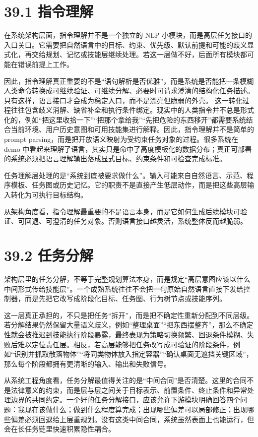 \section*{39.1 指令理解}


在系统架构层面，指令理解并不是一个独立的 NLP 小模块，而是高层任务接口的入口关口。它需要把自然语言中的目标、约束、优先级、默认前提和可能的歧义显式化，再交给规划、记忆或技能层继续处理。若这一层做不好，后面所有模块都可能在错误前提上工作。

因此，指令理解真正重要的不是“语句解析是否优雅”，而是系统是否能把一条模糊人类命令转换成可继续验证、可继续分解、必要时可请求澄清的结构化任务描述。只有这样，语言接口才会成为稳定入口，而不是漂亮但脆弱的外壳。 这一转化过程往往包含歧义消解、缺省补全和执行条件绑定。现实中的人类指令并不总是形式化的，例如“把这里收拾一下”“把那个拿给我”“先把危险的东西移开”都需要系统结合当前环境、用户历史意图和可用技能集进行解释。因此，指令理解并不是简单的 prompt parsing，而是把开放语义映射为受约束任务对象的过程。很多系统在 demo 中看起来理解了语言，其实只是命中了高度模板化的数据分布；真正可部署的系统必须把语言理解输出落成显式目标、约束条件和可检查完成标准。

任务理解层处理的是“系统到底被要求做什么”。输入可能来自自然语言、示范、程序模板、任务图或历史记忆。它的职责不是直接产生低层动作，而是把这些高层输入转化为可执行目标结构。

从架构角度看，指令理解最重要的不是语言本身，而是它如何生成后续模块可验证、可回退、可澄清的任务对象。否则语言接口越灵活，系统整体反而越脆弱。

\section*{39.2 任务分解}


架构层里的任务分解，不等于完整规划算法本身，而是规定“高层意图应该以什么中间形式传给技能层”。一个成熟系统往往不会把一句原始自然语言直接下发给控制器，而是先把它改写成阶段化目标、任务图、行为树节点或技能序列。

这一层真正承担的，不只是把任务“拆开”，而是把不确定性重新分配到不同层级。若分解结果仍然保留大量语义歧义，例如“整理桌面”“把东西摆整齐”，那么不确定性就会被推迟到技能执行阶段暴露，最终表现为策略切换频繁、回退条件模糊、失败后难以定位责任层。相反，若高层能够把任务改写成可验证的阶段条件，例如“识别并抓取散落物体”“将同类物体放入指定容器”“确认桌面无遮挡关键区域”，那么每个阶段都拥有更清晰的输入、输出和失败信号。

从系统工程角度看，任务分解最值得关注的是“中间合同”是否清楚。这里的合同不是法律意义的约束，而是层与层之间关于目标表示、前置条件、终止条件和异常处理边界的共同约定。一个好的任务分解接口，应该允许下游模块明确回答四个问题：我现在该做什么；做到什么程度算完成；出现哪些偏差可以局部修正；出现哪些偏差必须回退给上层重规划。没有这类中间合同，系统虽然表面上也能运行，但会在长任务链里快速积累隐性耦合。

